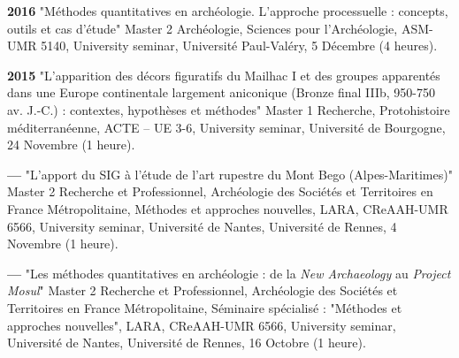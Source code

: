 \documentclass{article}
\newcommand{\fr}[1]{#1}       %
\newcommand{\en}[1]{}     %
\begin{document}
\smallbreak
\textbf{2016}
\fr{"Méthodes quantitatives en archéologie. L'approche processuelle : concepts, outils et cas d'étude" Master 2 Archéologie, Sciences pour l'Archéologie, ASM-UMR 5140, University seminar, Université Paul-Valéry, 5 Décembre (4 heures).}
\en{"Quantitative Methods in Archaeology. The Processual Approach: Concepts, Tools, and Case Studies" Master 2 in Archaeology, Sciences for Archaeology, ASM-UMR 5140, University Seminar, Paul-Valéry University, December 5 (4 hours).}

\smallbreak
\textbf{2015}
\fr{"L'apparition des décors figuratifs du Mailhac I et des groupes apparentés dans une Europe continentale largement aniconique (Bronze final IIIb, 950-750 av. J.-C.) : contextes, hypothèses et méthodes" Master 1 Recherche, Protohistoire méditerranéenne, ACTE -- UE 3-6, University seminar, Université de Bourgogne, 24 Novembre (1 heure).}
\en{"The Emergence of Figurative Decorations from Mailhac I and Related Groups in a Predominantly Aniconic Continental Europe (Late Bronze Age IIIb, 950-750 BC): Contexts, Hypotheses, and Methods" Master 1 Research, Mediterranean Protohistory, ACTE -- UE 3-6, University Seminar, University of Burgundy, November 24 (1 hour).}

\smallbreak
\textbf{--- }
\fr{"L'apport du SIG à l'étude de l'art rupestre du Mont Bego (Alpes-Maritimes)" Master 2 Recherche et Professionnel, Archéologie des Sociétés et Territoires en France Métropolitaine, Méthodes et approches nouvelles, LARA, CReAAH-UMR 6566, University seminar, Université de Nantes, Université de Rennes, 4 Novembre (1 heure).}
\en{"The Contribution of GIS to the Study of Rock Art at Mont Bego (Alpes-Maritimes)" Master 2 Research and Professional, Archaeology of Societies and Territories in Metropolitan France, New Methods and Approaches, LARA, CReAAH-UMR 6566, University Seminar, University of Nantes, University of Rennes, November 4 (1 hour).}

\smallbreak
\textbf{--- }
\fr{"Les méthodes quantitatives en archéologie : de la \textit{New Archaeology} au \textit{Project Mosul}" Master 2 Recherche et Professionnel, Archéologie des Sociétés et Territoires en France Métropolitaine, Séminaire spécialisé : "Méthodes et approches nouvelles", LARA, CReAAH-UMR 6566, University seminar, Université de Nantes, Université de Rennes, 16 Octobre (1 heure).}
\en{"Quantitative Methods in Archaeology: From \textit{New Archaeology} to \textit{Project Mosul}" Master 2 Research and Professional, Archaeology of Societies and Territories in Metropolitan France, Specialized Seminar: "New Methods and Approaches", LARA, CReAAH-UMR 6566, University Seminar, University of Nantes, University of Rennes, October 16 (1 hour).}
\end{document}
